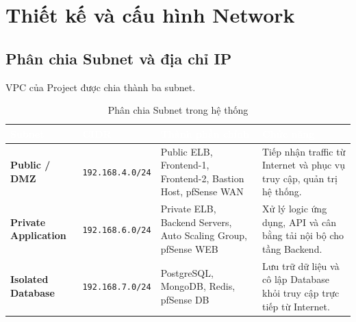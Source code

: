 \documentclass[12pt, a4paper]{article}
\begin{document}

\section{Thiết kế và cấu hình Network}

\subsection{Phân chia Subnet và địa chỉ IP}

VPC của Project được chia thành ba subnet.

\begin{table}[H]
    \centering
    \caption{Phân chia Subnet trong hệ thống}
    \label{tab:subnet_config}

    \renewcommand{\arraystretch}{1.4}
    \setlength{\tabcolsep}{7pt}

    \begin{tabularx}{\textwidth}{
        >{\centering\arraybackslash}p{3cm}
        >{\centering\arraybackslash}p{3cm}
        >{\raggedright\arraybackslash}X
        >{\raggedright\arraybackslash}X
    }
        \toprule

        \rowcolor{CMCBlue}
        \textcolor{white}{\textbf{Subnet}} &
        \textcolor{white}{\textbf{CIDR}} &
        \textcolor{white}{\textbf{Thành phần chính}} &
        \textcolor{white}{\textbf{Chức năng}} \\

        \midrule

        \rowcolor{LightBlue}
        \textbf{Public / DMZ} &
        \texttt{192.168.4.0/24} &
        Public ELB, Frontend-1, Frontend-2, Bastion Host, pfSense WAN &
        Tiếp nhận traffic từ Internet và phục vụ truy cập, quản trị hệ thống. \\

        \textbf{Private Application} &
        \texttt{192.168.6.0/24} &
        Private ELB, Backend Servers, Auto Scaling Group, pfSense WEB &
        Xử lý logic ứng dụng, API và cân bằng tải nội bộ cho tầng Backend. \\

        \rowcolor{LightBlue}
        \textbf{Isolated Database} &
        \texttt{192.168.7.0/24} &
        PostgreSQL, MongoDB, Redis, pfSense DB &
        Lưu trữ dữ liệu và cô lập Database khỏi truy cập trực tiếp từ Internet. \\

        \bottomrule
    \end{tabularx}
\end{table}
\end{document}
